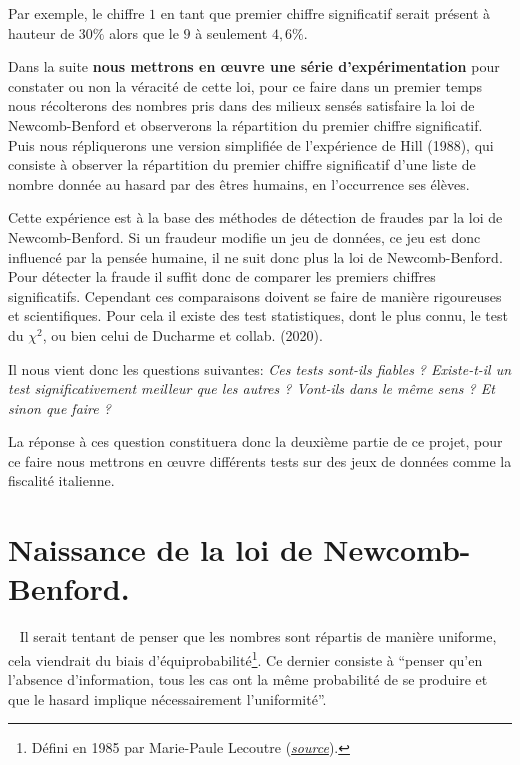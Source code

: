 \documentclass[
  12pt,
]{article}
\begin{document}
Par exemple, le chiffre \(1\) en tant que premier chiffre significatif
serait présent à hauteur de \(30\%\) alors que le \(9\) à seulement
\(4,6\%\).

Dans la suite \textbf{nous mettrons en œuvre une série
d'expérimentation} pour constater ou non la véracité de cette loi, pour
ce faire dans un premier temps nous récolterons des nombres pris dans
des milieux sensés satisfaire la loi de Newcomb-Benford et observerons
la répartition du premier chiffre significatif. Puis nous répliquerons
une version simplifiée de l'expérience de Hill (1988), qui consiste à
observer la répartition du premier chiffre significatif d'une liste de
nombre donnée au hasard par des êtres humains, en l'occurrence ses
élèves.

Cette expérience est à la base des méthodes de détection de fraudes par
la loi de Newcomb-Benford. Si un fraudeur modifie un jeu de données, ce
jeu est donc influencé par la pensée humaine, il ne suit donc plus la
loi de Newcomb-Benford. Pour détecter la fraude il suffit donc de
comparer les premiers chiffres significatifs. Cependant ces comparaisons
doivent se faire de manière rigoureuses et scientifiques. Pour cela il
existe des test statistiques, dont le plus connu, le test du \(\chi^2\),
ou bien celui de Ducharme et collab. (2020).

Il nous vient donc les questions suivantes: \emph{Ces tests sont-ils
fiables ? Existe-t-il un test significativement meilleur que les autres
? Vont-ils dans le même sens ? Et sinon que faire ?}

La réponse à ces question constituera donc la deuxième partie de ce
projet, pour ce faire nous mettrons en œuvre différents tests sur des
jeux de données comme la fiscalité italienne.

\newpage

\hypertarget{naissance-de-la-loi-de-newcomb-benford.}{%
\section{Naissance de la loi de
Newcomb-Benford.}\label{naissance-de-la-loi-de-newcomb-benford.}}

~ Il serait tentant de penser que les nombres sont répartis de manière
uniforme, cela viendrait du biais d'équiprobabilité\footnote{Défini en
  1985 par Marie-Paule Lecoutre
  (\href{https://fr.wikipedia.org/wiki/Biais_d\%27\%C3\%A9quiprobabilit\%C3\%A9}{\emph{source}}).}.
Ce dernier consiste à ``penser qu'en l'absence d'information, tous les
cas ont la même probabilité de se produire et que le hasard implique
nécessairement l'uniformité''.
\end{document}
